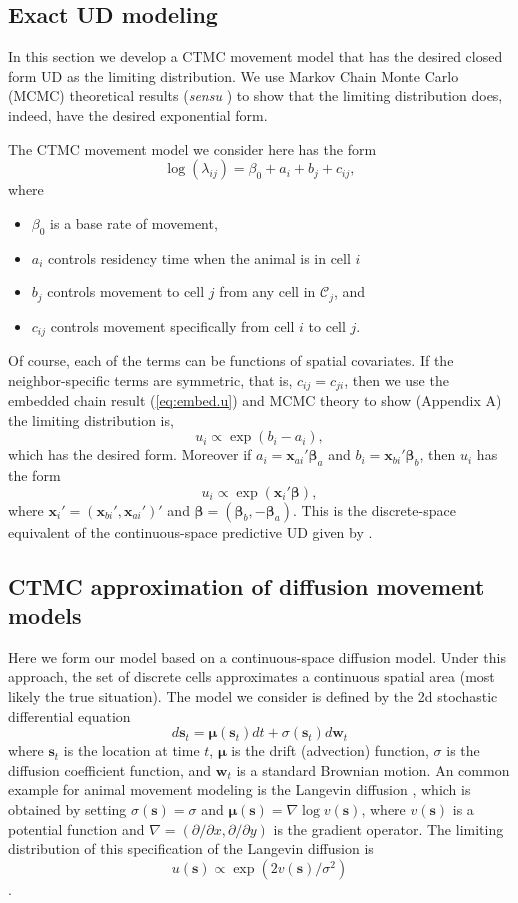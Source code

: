 \documentclass[12pt]{article}
\newcommand{\bx}{\ensuremath{\mathbf{x}}}
\newcommand{\bw}{\ensuremath{\mathbf{w}}}
\newcommand{\bs}{\ensuremath{\mathbf{s}}}
\newcommand{\bb}{\ensuremath{\boldsymbol{\beta}}}
\newcommand{\bmu}{\ensuremath{\boldsymbol{\mu}}}
\newcommand{\fC}{\ensuremath{\mathcal{C}}}
\begin{document}
\subsection{Exact UD modeling}

In this section we develop a CTMC movement model that has the desired closed form UD as the limiting distribution. We use Markov Chain Monte Carlo (MCMC) theoretical results ({\it sensu} \citealt{michelot2018linking}) to show that the limiting distribution does, indeed, have the desired exponential form. 

The CTMC movement model we consider here has the form  
\begin{equation}
\label{eq:rate}
\log(\lambda_{ij}) = \beta_0 + a_i + b_j + c_{ij},
\end{equation}
where 
\begin{itemize}
\item $\beta_0$ is a base rate of movement,
\item $a_i$ controls residency time when the animal is in cell $i$
\item $b_j$ controls movement to cell $j$ from any cell in $\fC_j$, and
\item $c_{ij}$ controls movement specifically from cell $i$ to cell $j$.
\end{itemize}
Of course, each of the terms can be functions of spatial covariates. If the neighbor-specific terms are symmetric, that is, $c_{ij} = c_{ji}$, then we use the embedded chain result (\ref{eq:embed.u}) and MCMC theory to show (Appendix A) the limiting distribution is,
\[
u_i \propto \exp(b_i - a_i),
\]
which has the desired form. Moreover if $a_i = \bx_{ai}'\bb_a$ and $b_i = \bx_{bi}'\bb_b$, then $u_i$ has the form
\[
u_i \propto  \exp(\bx_i' \bb),
\] 
where $\bx_i' = (\bx_{bi}',\bx_{ai}')'$ and $\bb = (\bb_b, -\bb_a)$. This is the discrete-space equivalent of the continuous-space predictive UD given by \cite{Barnett:2008wj}. 

\subsection{CTMC approximation of diffusion movement models}

Here we form our model based on a continuous-space diffusion model. Under this approach, the set of discrete cells approximates a continuous spatial area (most likely the true situation). The model we consider is defined by the 2d stochastic differential equation 
\[
d\bs_t = \bmu(\bs_t)dt + \sigma(\bs_t)d\mathbf{w}_t
\]
where $\bs_t$ is the location at time $t$, $\bmu$ is the drift (advection) function, $\sigma$ is the diffusion coefficient function, and $\bw_t$ is a standard Brownian motion. An common example for animal movement modeling is the Langevin diffusion \citep{michelot2018langevin}, which is obtained by setting $\sigma(\bs) = \sigma$ and $\bmu(\bs) = \nabla \log v(\bs)$, where $v(\bs)$ is a potential function \citep{xxx} and $\nabla = (\partial/\partial x, \partial/\partial y)$ is the gradient operator. The limiting distribution of this specification of the Langevin diffusion is 
\[
u(\bs) \propto \exp(2v(\bs)/\sigma^2)
\] 
\citep{xxx}.
\end{document}
